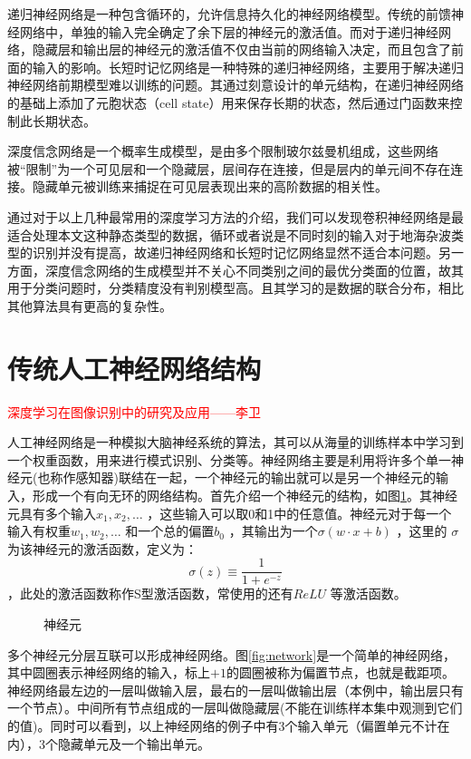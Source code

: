 递归神经网络是一种包含循环的，允许信息持久化的神经网络模型。传统的前馈神经网络中，单独的输入完全确定了余下层的神经元的激活值。而对于递归神经网络，隐藏层和输出层的神经元的激活值不仅由当前的网络输入决定，而且包含了前面的输入的影响。长短时记忆网络是一种特殊的递归神经网络，主要用于解决递归神经网络前期模型难以训练的问题。其通过刻意设计的单元结构，在递归神经网络的基础上添加了元胞状态（cell state）用来保存长期的状态，然后通过门函数来控制此长期状态。

深度信念网络是一个概率生成模型，是由多个限制玻尔兹曼机组成，这些网络被“限制”为一个可见层和一个隐藏层，层间存在连接，但是层内的单元间不存在连接。隐藏单元被训练来捕捉在可见层表现出来的高阶数据的相关性。

通过对于以上几种最常用的深度学习方法的介绍，我们可以发现卷积神经网络是最适合处理本文这种静态类型的数据，循环或者说是不同时刻的输入对于地海杂波类型的识别并没有提高，故递归神经网络和长短时记忆网络显然不适合本问题。另一方面，深度信念网络的生成模型并不关心不同类别之间的最优分类面的位置，故其用于分类问题时，分类精度没有判别模型高。且其学习的是数据的联合分布，相比其他算法具有更高的复杂性。

\section{传统人工神经网络结构}
\textcolor{red}{深度学习在图像识别中的研究及应用——李卫}

人工神经网络是一种模拟大脑神经系统的算法，其可以从海量的训练样本中学习到一个权重函数，用来进行模式识别、分类等。神经网络主要是利用将许多个单一神经元(也称作感知器)联结在一起，一个神经元的输出就可以是另一个神经元的输入，形成一个有向无环的网络结构。首先介绍一个神经元的结构，如图\ref{fig:neural}。其神经元具有多个输入$x_1,x_2,\dots $ ，这些输入可以取0和1中的任意值。神经元对于每一个输入有权重$w_1,w_2,\dots $ 和一个总的偏置$b_0$ ，其输出为一个$\sigma(w\cdot x + b)$ ，这里的 $\sigma$为该神经元的激活函数，定义为：
\begin{equation}
  \sigma(z)\equiv\frac{1}{1+e^{-z}}  
\end{equation}
，此处的激活函数称作S型激活函数，常使用的还有$ReLU $ 等激活函数。
\begin{figure}
  \centering
  
  \caption{神经元}
  \label{fig:neural}  
\end{figure}

多个神经元分层互联可以形成神经网络。图\ref{fig:network}是一个简单的神经网络，其中圆圈表示神经网络的输入，标上$ +1$的圆圈被称为偏置节点，也就是截距项。神经网络最左边的一层叫做输入层，最右的一层叫做输出层（本例中，输出层只有一个节点）。中间所有节点组成的一层叫做隐藏层(不能在训练样本集中观测到它们的值)。同时可以看到，以上神经网络的例子中有3个输入单元（偏置单元不计在内），3个隐藏单元及一个输出单元。

